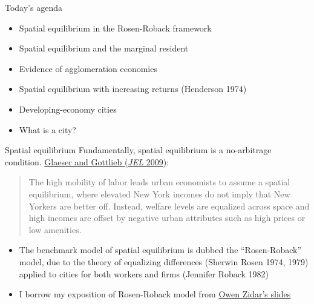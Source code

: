\documentclass[11pt,notes=hide,aspectratio=169]{beamer}
\begin{document}
\begin{frame}{Today's agenda}
\begin{itemize}
\item Spatial equilibrium in the Rosen-Roback framework
\item Spatial equilibrium and the marginal resident
\item Evidence of agglomeration economies
\item Spatial equilibrium with increasing returns (Henderson 1974)
\item Developing-economy cities
\item What is a city?
\end{itemize}
\end{frame}
\begin{frame}{Spatial equilibrium}
Fundamentally, spatial equilibrium is a no-arbitrage condition.
\href{https://www.aeaweb.org/articles?id=10.1257/jel.47.4.983}{Glaeser and Gottlieb (\textit{JEL} 2009)}:
\begin{quote}
The high mobility of labor leads urban economists to assume a spatial equilibrium, where elevated New York incomes do not imply that New Yorkers are better off. Instead, welfare levels are equalized across space and high incomes are offset by negative urban attributes such as high prices or low amenities.
\end{quote}
\vspace{-4mm}
\begin{itemize}
	\item The benchmark model of spatial equilibrium is dubbed the ``Rosen-Roback'' model, due to the theory of equalizing differences (Sherwin Rosen 1974, 1979) applied to cities for both workers and firms (Jennifer Roback 1982)
	\item I borrow my exposition of Rosen-Roback model from \href{https://scholar.princeton.edu/sites/default/files/zidar/files/zidar_eco524_s2020_lec2.pdf}{Owen Zidar's slides}
\end{itemize}
\end{frame}
\end{document}
